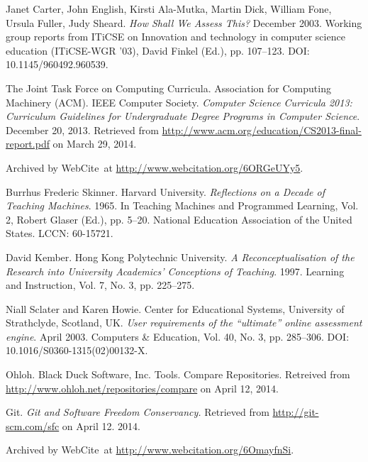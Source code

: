 \begin{thebibliography}{9}
Janet Carter, John English, Kirsti Ala-Mutka, Martin Dick, William Fone, Ursula
Fuller, Judy Sheard. \emph{How Shall We Assess This?} December 2003. Working
group reports from ITiCSE on Innovation and technology in computer science
education (ITiCSE-WGR '03), David Finkel (Ed.), pp. 107--123.
DOI: 10.1145/960492.960539.


The Joint Task Force on Computing Curricula. Association for Computing
Machinery (ACM). IEEE Computer Society. \emph{Computer Science Curricula 2013:
Curriculum Guidelines for Undergraduate Degree Programs in Computer Science}.
December 20, 2013. Retrieved from
\url{http://www.acm.org/education/CS2013-final-report.pdf} on March 29, 2014.

Archived by WebCite\textsuperscript{\textregistered}\ at
\url{http://www.webcitation.org/6ORGeUYy5}.


Burrhus Frederic Skinner. Harvard University. \emph{Reflections on a Decade of
Teaching Machines}. 1965. In Teaching Machines and Programmed Learning, Vol. 2,
Robert Glaser (Ed.), pp. 5--20. National Education Association of the United
States. LCCN: 60-15721.


David Kember. Hong Kong Polytechnic University. \emph{A Reconceptualisation of
the Research into University Academics' Conceptions of Teaching}. 1997.
Learning and Instruction, Vol. 7, No. 3, pp. 225--275.


Niall Sclater and Karen Howie. Center for Educational Systems, University of
Strathclyde, Scotland, UK. \emph{User requirements of the ``ultimate'' online
assessment engine}. April 2003. Computers \& Education, Vol. 40, No. 3, pp.
285--306. DOI: 10.1016/S0360-1315(02)00132-X.


Ohloh. Black Duck Software, Inc. Tools. Compare Repositories. Retreived from
\url{http://www.ohloh.net/repositories/compare} on April 12, 2014.


Git. \emph{Git and Software Freedom Conservancy.} Retrieved from
\url{http://git-scm.com/sfc} on April 12. 2014.

Archived by WebCite\textsuperscript{\textregistered}\ at
\url{http://www.webcitation.org/6OmayfnSi}.


\end{thebibliography}
